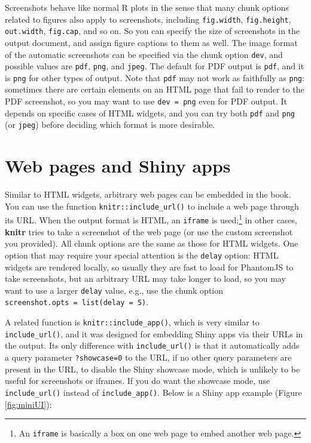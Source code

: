 \documentclass[
  12pt,
]{krantz}
\theoremstyle{definition}
\theoremstyle{definition}
\theoremstyle{definition}
\theoremstyle{definition}
\theoremstyle{remark}
\begin{document}
Screenshots behave like normal R plots in the sense that many chunk options related to figures also apply to screenshots, including \texttt{fig.width}, \texttt{fig.height}, \texttt{out.width}, \texttt{fig.cap}, and so on. So you can specify the size of screenshots in the output document, and assign figure captions to them as well. The image format of the automatic screenshots can be specified via the chunk option \texttt{dev}, and possible values are \texttt{pdf}, \texttt{png}, and \texttt{jpeg}. The default for PDF output is \texttt{pdf}, and it is \texttt{png} for other types of output. Note that \texttt{pdf} may not work as faithfully as \texttt{png}: sometimes there are certain elements on an HTML page that fail to render to the PDF screenshot, so you may want to use \texttt{dev\ =\ \textquotesingle{}png\textquotesingle{}} even for PDF output. It depends on specific cases of HTML widgets, and you can try both \texttt{pdf} and \texttt{png} (or \texttt{jpeg}) before deciding which format is more desirable.

\section{Web pages and Shiny apps}\label{web-pages-and-shiny-apps}

Similar to HTML widgets, arbitrary web pages can be embedded in the book. You can use the function \texttt{knitr::include\_url()} to include a web page through its URL. When the output format is HTML, an \texttt{iframe} is used;\footnote{An \texttt{iframe} is basically a box on one web page to embed another web page.} in other cases, \textbf{knitr} tries to take a screenshot of the web page (or use the custom screenshot you provided). All chunk options are the same as those for HTML widgets. One option that may require your special attention is the \texttt{delay} option: HTML widgets are rendered locally, so usually they are fast to load for PhantomJS to take screenshots, but an arbitrary URL may take longer to load, so you may want to use a larger \texttt{delay} value, e.g., use the chunk option \texttt{screenshot.opts\ =\ list(delay\ =\ 5)}.

A related function is \texttt{knitr::include\_app()}, which is very similar to \texttt{include\_url()}, and it was designed for embedding Shiny apps via their URLs in the output. Its only difference with \texttt{include\_url()} is that it automatically adds a query parameter \texttt{?showcase=0} to the URL, if no other query parameters are present in the URL, to disable the Shiny showcase mode, which is unlikely to be useful for screenshots or iframes. If you do want the showcase mode, use \texttt{include\_url()} instead of \texttt{include\_app()}. Below is a Shiny app example (Figure \ref{fig:miniUI}):
\end{document}

